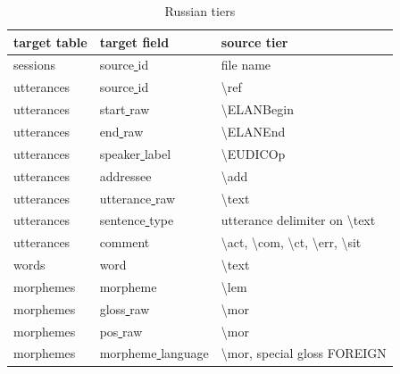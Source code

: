 \documentclass[a4paper, 11pt]{book}
\newcommand{\bks}{\textbackslash}	%
\newcommand{\und}{\underline{{ }}\hspace{0.2mm}}	%
\begin{document}
\begin{table}[ht!]
	\centering
	\begin{tabular}{lll}
		\toprule
			\textbf{target table} & \textbf{target field} & \textbf{source tier} \\
		\midrule
			sessions 	& source\und id 	& file name \\
			utterances 	& source\und id	& \bks ref \\
			utterances 	& start\und raw		& \bks ELANBegin \\
			utterances 	& end\und raw		& \bks ELANEnd \\
			utterances 	& speaker\und label	& \bks EUDICOp \\
			utterances 	& addressee			& \bks add \\
			utterances 	& utterance\und raw & \bks text \\
			utterances 	& sentence\und type	& utterance delimiter on \bks text \\
			utterances 	& comment			& \bks act, \bks com, \bks ct, \bks err, \bks sit \\

			words	 	& word				& \bks text \\
			morphemes	& morpheme			& \bks lem \\
			morphemes	& gloss\und raw		& \bks mor \\
			morphemes	& pos\und raw		& \bks mor \\
			morphemes	& morpheme\und language			& \bks mor, special gloss FOREIGN \\

		\bottomrule
	\end{tabular}
	\caption{Russian tiers}
	\label{tab:Russian tiers}
\end{table}
\end{document}
